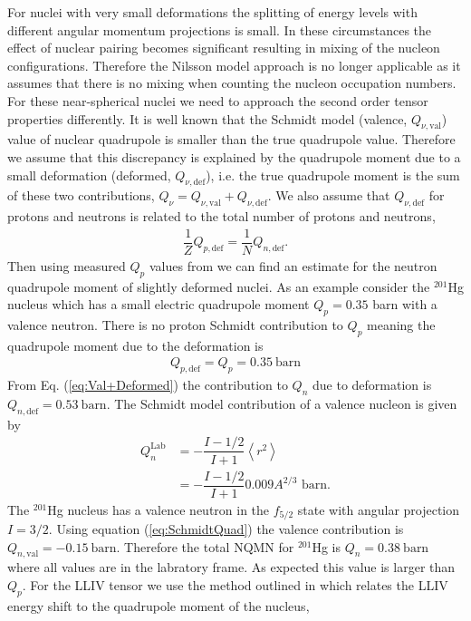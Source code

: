 \documentclass[10pt,a4paper, twoside]{report}
\begin{document}
For nuclei with very small deformations the splitting of energy levels with different angular momentum projections is small.
 In these circumstances the effect of nuclear pairing becomes significant resulting in mixing of the nucleon configurations. Therefore the Nilsson model approach is no longer applicable as it assumes that there is no mixing when counting the nucleon occupation numbers. For these near-spherical nuclei we need to approach the second order tensor properties differently.  It is well known that the Schmidt model (valence, $Q_{\nu, \text{val}}$) value of nuclear quadrupole is smaller than the true quadrupole value. Therefore we assume that this discrepancy is explained by the quadrupole moment due to a small deformation (deformed, $Q_{\nu, \text{def}}$), i.e. the true quadrupole moment is the sum of these two contributions, $Q_{\nu} = Q_{\nu, \text{val}} + Q_{\nu, \text{def}}$. We also assume that $Q_{\nu,\text{def}}$ for protons and neutrons is related to the total number of protons and neutrons,
\begin{align} \label{eq:Val+Deformed}
\dfrac{1}{Z}Q_{p, \text{def}} = \dfrac{1}{N}Q_{n,\text{def}}.
\end{align}
Then using measured $Q_{p}$ values from \cite{Stone2005} we can find an estimate for the neutron quadrupole moment of slightly deformed nuclei. As an example consider the $^{201}$Hg nucleus which has a small electric quadrupole moment $Q_{p} = 0.35 $ barn with a valence neutron. There is no proton Schmidt contribution to $Q_{p}$ meaning the quadrupole moment due to the deformation is 
\begin{align*}
Q_{p,\text{def}} = Q_{p} = 0.35 \ \text{barn}
\end{align*}
From Eq. (\ref{eq:Val+Deformed}) the contribution to $Q_{n}$ due to deformation is $Q_{n,\text{def}} = 0.53 \ \text{barn}$. The Schmidt model contribution of a valence nucleon is given by \cite{BohrMottVol1, Flambaum2016}
\begin{align} \label{eq:SchmidtQuad}
Q_{n}^{\text{Lab}} &= -\dfrac{I - 1/2}{I + 1}\left<r^2\right> \\
&= -\dfrac{I - 1/2}{I + 1}0.009A^{2/3} \text{ barn}.
\end{align}
 The $^{201}$Hg nucleus has a valence neutron in the $f_{5/2}$ state with angular projection $I =3/2$. Using equation (\ref{eq:SchmidtQuad}) the valence contribution is $Q_{n,\text{val}} = -0.15 \ \text{barn}$. Therefore the total NQMN for $^{201}$Hg is $Q_{n} = 0.38 \ \text{barn}$ where all values are in the labratory frame. As expected this value is larger than $Q_{p}$. For the LLIV tensor we use the method outlined in \cite{Flambaum2016} which relates the LLIV energy shift to the quadrupole moment of the nucleus,
\end{document}
